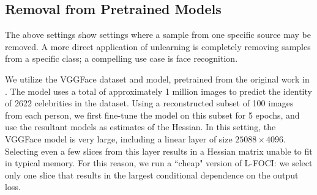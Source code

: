 \subsection{Removal from Pretrained Models}
The above settings show settings where a sample from one specific source may be removed. A more direct application of unlearning 
is completely removing samples from a specific class; a compelling use case is face recognition.

We utilize the VGGFace dataset and model, pretrained from the original work in \cite{huang2008labeled,Parkhi15}. The model uses a total of approximately 1 million images to predict the identity of 2622 celebrities in the dataset. Using a reconstructed subset of 100 images from each person, we first fine-tune the model on this subset for 5 epochs, and use the resultant models as estimates of the Hessian. 
In this setting, the VGGFace model is very large, including a linear layer of size $25088 \times 4096$. Selecting even a few slices from this layer results in a Hessian matrix unable to fit in typical memory. For this reason, we run a ``cheap" version of L-FOCI: we select only one slice that results in the largest conditional dependence on the output loss.
%


